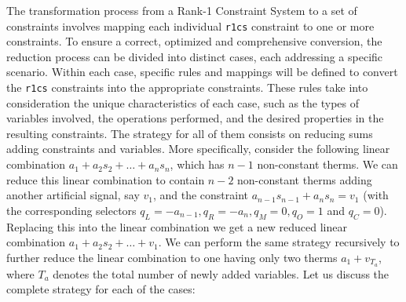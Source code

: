 The transformation process from a Rank-1 Constraint System to a set of \plonk constraints involves mapping each individual \texttt{r1cs} constraint to one or more \plonk constraints. To ensure a correct, optimized and comprehensive conversion, the reduction process can be divided into distinct cases, each addressing a specific scenario. Within each case, specific rules and mappings will be defined to convert the \texttt{r1cs} constraints into the appropriate \plonk constraints. These rules take into consideration the unique characteristics of each case, such as the types of variables involved, the operations performed, and the desired properties in the resulting \plonk constraints. The strategy for all of them consists on reducing sums adding constraints and variables. More specifically, consider the following linear combination $a_1 + a_2 s_2 + \dots + a_n s_n$, which has $n-1$ non-constant therms. We can reduce this linear combination to contain $n-2$ non-constant therms adding another artificial signal, say $v_1$, and the constraint $a_{n-1} s_{n-1} + a_n s_n = v_1$ (with the corresponding \plonk selectors $q_L = - a_{n-1}, q_R = - a_n, q_M = 0, q_O = 1$ and $q_C = 0$). Replacing this into the linear combination we get a new reduced linear combination $a_1 + a_2 s_2 + \dots + v_1$. We can perform the same strategy recursively to further reduce the linear combination to one having only two therms $a_1 + v_{T_a}$, where $T_a$ denotes the total number of newly added variables. Let us discuss the complete strategy for each of the cases:

